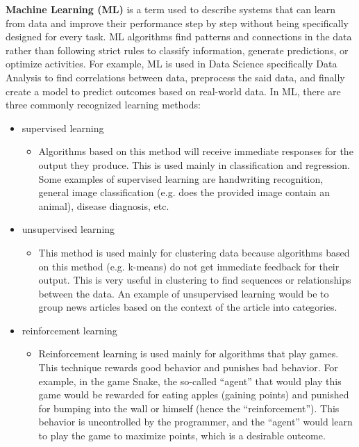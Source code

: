 \textbf{Machine Learning (ML)} is a term used to describe systems that can learn from data and improve their performance step by step without being specifically designed for every task. ML algorithms find patterns and connections in the data rather than following strict rules to classify information, generate predictions, or optimize activities. For example, ML is used in Data Science specifically Data Analysis to find correlations between data, preprocess the said data, and finally create a model to predict outcomes based on real-world data. In ML, there are three commonly recognized learning methods:
\begin{itemize}
    \item supervised learning
        \begin{itemize}
            \item Algorithms based on this method will receive immediate responses for the output they produce. This is used mainly in classification and regression. Some examples of supervised learning are handwriting recognition, general image classification (e.g. does the provided image contain an animal), disease diagnosis, etc.
        \end{itemize}
    \item unsupervised learning
        \begin{itemize}
                \item This method is used mainly for clustering data because algorithms based on this method (e.g. k-means) do not get immediate feedback for their output. This is very useful in clustering to find sequences or relationships between the data. An example of unsupervised learning would be to group news articles based on the context of the article into categories.
            \end{itemize}
    \item reinforcement learning
        \begin{itemize}
            \item Reinforcement learning is used mainly for algorithms that play games. This technique rewards good behavior and punishes bad behavior. For example, in the game Snake, the so-called ``agent'' that would play this game would be rewarded for eating apples (gaining points) and punished for bumping into the wall or himself (hence the ``reinforcement''). This behavior is uncontrolled by the programmer, and the ``agent'' would learn to play the game to maximize points, which is a desirable outcome.
        \end{itemize}
\end{itemize}

